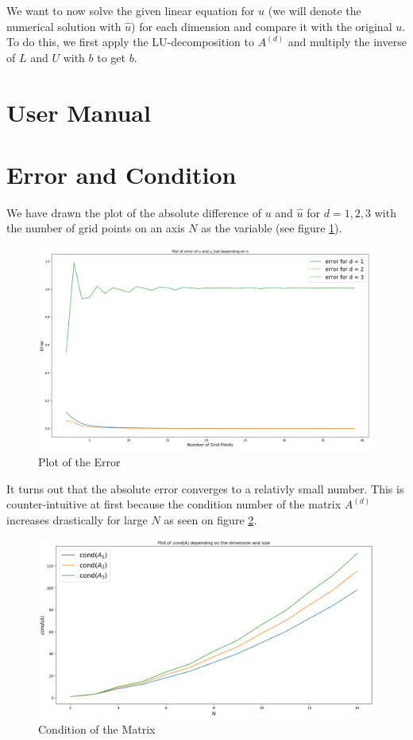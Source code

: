 \documentclass[refman]{article}
\theoremstyle{definition}
\begin{document}
We want to now solve the given linear equation for \(u\) (we will denote the numerical solution with \(\hat{u}\)) for each dimension and compare it with the original \(u\). To do this, we first apply the LU-decomposition to \(A^{(d)}\) and multiply the inverse of \(L\) and \(U\) with \(b\) to get \(b\).

\section{User Manual}

\section{Error and Condition}

We have drawn the plot of the absolute difference of \(u\) and \(\hat{u}\) for \(d = 1, 2, 3\) with the number of grid points on an axis \(N\) as the variable (see figure \ref{fig:plot_error}).

\begin{figure}[h]
	\includegraphics[width=\linewidth]{graphics/plot_error.png}
	\caption{Plot of the Error}
	\label{fig:plot_error}
\end{figure}
\bigskip

It turns out that the absolute error converges to a relativly small number. This is counter-intuitive at first because the condition number of the matrix \(A^{(d)}\) increases drastically for large \(N\) as seen on figure \ref{fig:cond_matrix}.

\begin{figure}[h]
	\includegraphics[width=\linewidth]{graphics/cond_matrix.png}
	\caption{Condition of the Matrix}
	\label{fig:cond_matrix}
\end{figure}
\bigskip
\end{document}
